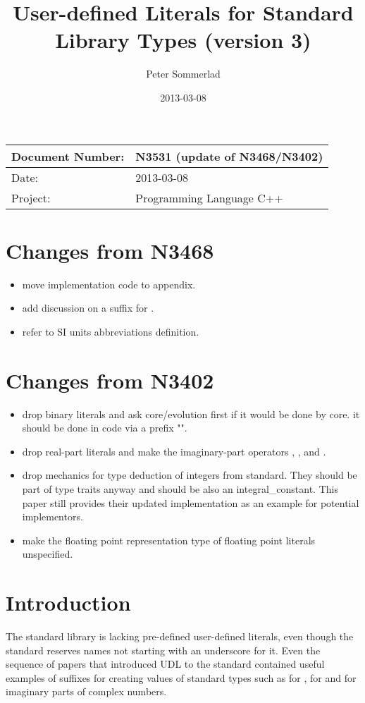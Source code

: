 \documentclass[ebook,11pt,article]{memoir}
\title{User-defined Literals for Standard Library Types (version 3)}
\author{Peter Sommerlad}
\date{2013-03-08}                                           %
\begin{document}
\maketitle
\begin{tabular}[t]{|l|l|}\hline 
Document Number: &  N3531 (update of N3468/N3402)\\\hline
Date: & 2013-03-08 \\\hline
Project: & Programming Language C++\\\hline 
\end{tabular}
\chapter{Changes from N3468}
\begin{itemize}
\item move implementation code to appendix.
\item add discussion on a suffix for .
\item refer to SI units abbreviations definition.
\end{itemize}

\chapter{Changes from N3402}
\begin{itemize}
\item drop binary literals and ask core/evolution first if it would be done by core. it should be done in code via a prefix "".
\item drop real-part  literals  and make the imaginary-part operators , , and .
\item drop mechanics for type deduction of integers from standard. They should be part of type traits anyway and should be also an integral\_constant. This paper still provides their updated implementation as an example for potential implementors.
\item make the floating point representation type of  floating point literals unspecified.
\end{itemize}


\chapter{Introduction}
The standard library is lacking pre-defined user-defined literals, even though the standard reserves names not starting with an underscore for it. Even the sequence of papers that introduced UDL to the standard contained useful examples of suffixes for creating values of standard types such as  for ,  for  and  for imaginary parts of complex numbers.
\end{document}
